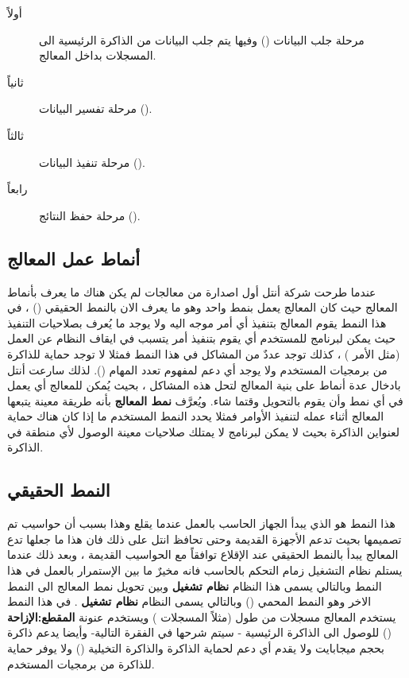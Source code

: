 \documentclass[document.tex]{subfiles}
\begin{document}
\begin{description}
\item [أولاً] مرحلة جلب البيانات () وفيها يتم جلب البيانات من الذاكرة الرئيسية الى المسجلات بداخل المعالج.
\item [ثانياً] مرحلة تفسير البيانات ().
\item [ثالثاً] مرحلة تنفيذ البيانات ().
\item [رابعاً] مرحلة حفظ النتائج ().
\end{description}

\subsection{أنماط عمل المعالج }
عندما طرحت شركة أنتل أول اصدارة من معالجات  لم يكن هناك ما يعرف بأنماط المعالج حيث كان المعالج يعمل بنمط واحد وهو ما يعرف الان بالنمط الحقيقي () ، في هذا النمط يقوم المعالج بتنفيذ أي أمر موجه اليه ولا يوجد ما يُعرف بصلاحيات التنفيذ حيث يمكن لبرنامج للمستخدم أي يقوم بتنفيذ أمر يتسبب في ايقاف النظام عن العمل (مثل الأمر ) ، كذلك توجد عددٌ من المشاكل في هذا النمط فمثلا لا توجد حماية للذاكرة من برمجيات المستخدم ولا يوجد أي دعم لمفهوم تعدد المهام (). لذلك سارعت أنتل بادخال عدة أنماط على بنية المعالج لتحل هذه المشاكل ، بحيث يُمكن للمعالج أي يعمل في أي نمط وأن يقوم بالتحويل وقتما شاء. ويُعرَّف \textbf{نمط المعالج} بأنه طريقة معينة يتبعها المعالج أثناء عمله لتنفيذ الأوامر فمثلا يحدد النمط المستخدم ما إذا كان هناك حماية لعنواين الذاكرة بحيث لا يمكن لبرنامج لا يمتلك صلاحيات معينة الوصول لأي منطقة في الذاكرة. 

\subsection{النمط الحقيقي }
هذا النمط هو الذي يبدأ الجهاز الحاسب بالعمل عندما يقلع وهذا بسبب أن حواسيب  تم تصميمها بحيث تدعم الأجهزة القديمة وحتى تحافظ انتل على ذلك فان هذا ما جعلها تدع المعالج يبدأ بالنمط الحقيقي عند الإقلاع توافقاً مع الحواسيب القديمة ، وبعد ذلك عندما يستلم نظام التشغيل زمام التحكم بالحاسب فانه مخيرٌ ما بين الإستمرار بالعمل في هذا النمط وبالتالي يسمى هذا النظام \textbf{نظام تشغيل } وبين تحويل نمط المعالج الى النمط الاخر وهو النمط المحمي () وبالتالي يسمى النظام \textbf{نظام تشغيل }.
في هذا النمط يستخدم المعالج مسجلات من طول  (مثلاً المسجلات ) ويستخدم عنونة \textbf{المقطع:الإزاحة} () للوصول الى الذاكرة الرئيسية - سيتم شرحها في الفقرة التالية- وأيضا يدعم ذاكرة بحجم  ميجابايت ولا يقدم أي دعم لحماية الذاكرة والذاكرة التخيلية () ولا يوفر حماية للذاكرة من برمجيات المستخدم.
\end{document}
